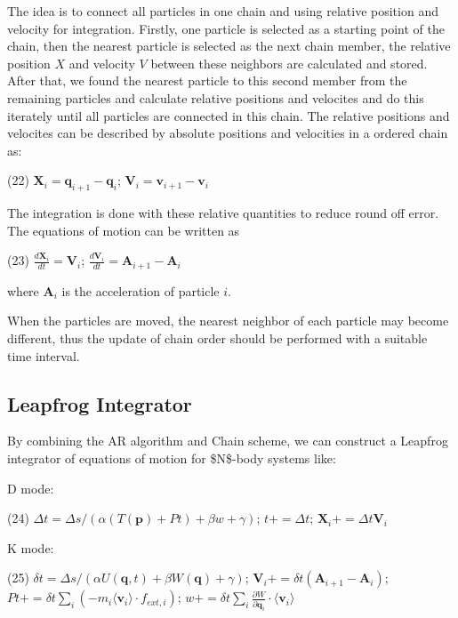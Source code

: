 The idea is to connect all particles in one chain and using relative position and velocity for integration. Firstly, one particle is selected as a starting point of the chain, then the nearest particle is selected as the next chain member, the relative position $ X $ and velocity $ V $ between these neighbors are calculated and stored. After that, we found the nearest particle to this second member from the remaining particles and calculate relative positions and velocites and do this iterately until all particles are connected in this chain. The relative positions and velocites can be described by absolute positions and velocities in a ordered chain as\+:

(22) $ \mathbf{X}_i = \mathbf{q}_{i+1} - \mathbf{q}_i $; $ \mathbf{V}_i = \mathbf{v}_{i+1} - \mathbf{v}_i $

The integration is done with these relative quantities to reduce round off error. The equations of motion can be written as

(23) $ \frac{d \mathbf{X}_i}{d t} = \mathbf{V}_i $; $ \frac{d \mathbf{V}_i}{d t} = \mathbf{A}_{i+1} - \mathbf{A}_i $

where $ \mathbf{A}_i $ is the acceleration of particle $ i$.

When the particles are moved, the nearest neighbor of each particle may become different, thus the update of chain order should be performed with a suitable time interval.\hypertarget{index_leap_sec}{}\subsection{Leapfrog Integrator}\label{index_leap_sec}
By combining the AR algorithm and Chain scheme, we can construct a Leapfrog integrator of equations of motion for \$N\$-\/body systems like\+:
\begin{DoxyItemize}
\item D mode\+:
\end{DoxyItemize}

(24) $ \Delta t = \Delta s / (\alpha (T(\mathbf{p}) + Pt) + \beta w + \gamma) $; $ t += \Delta t $; $ \mathbf{X}_i += \Delta t \mathbf{V}_i $


\begin{DoxyItemize}
\item K mode\+:
\end{DoxyItemize}

(25) $ \delta t = \Delta s / (\alpha U(\mathbf{q},t) + \beta W(\mathbf{q}) + \gamma) $; $ \mathbf{V}_i += \delta t (\mathbf{A}_{i+1} - \mathbf{A}_{i}) $; $ Pt += \delta t \sum_i (-m_i \langle \mathbf{v}_i \rangle \cdot f_{ext,i}) $; $ w += \delta t \sum_i \frac{\partial W}{\partial \mathbf{q}_i} \cdot \langle \mathbf{v}_i \rangle $


